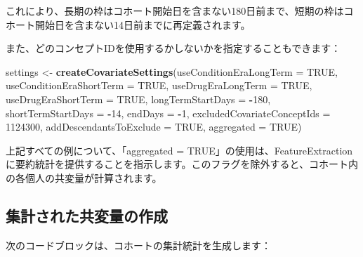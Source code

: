 \documentclass[
  11pt]{book}
\makeatletter
\newenvironment{Shaded}{\begin{snugshade}}{\end{snugshade}}
\newcommand{\AttributeTok}[1]{\textcolor[rgb]{0.13,0.29,0.53}{#1}}
\newcommand{\ConstantTok}[1]{\textcolor[rgb]{0.56,0.35,0.01}{#1}}
\newcommand{\DecValTok}[1]{\textcolor[rgb]{0.00,0.00,0.81}{#1}}
\newcommand{\FunctionTok}[1]{\textcolor[rgb]{0.13,0.29,0.53}{\textbf{#1}}}
\newcommand{\NormalTok}[1]{#1}
\newcommand{\OtherTok}[1]{\textcolor[rgb]{0.56,0.35,0.01}{#1}}
\newcommand{\SpecialCharTok}[1]{\textcolor[rgb]{0.81,0.36,0.00}{\textbf{#1}}}
\newenvironment{kframe}{%
\medskip{}
\setlength{\fboxsep}{.8em}
 \def\at@end@of@kframe{}%
 \ifinner\ifhmode%
  \def\at@end@of@kframe{\end{minipage}}%
  \begin{minipage}{\columnwidth}%
 \fi\fi%
 \def\FrameCommand##1{\hskip\@totalleftmargin \hskip-\fboxsep
 \colorbox{myShadeColor}{##1}\hskip-\fboxsep
     \hskip-\linewidth \hskip-\@totalleftmargin \hskip\columnwidth}%
 \MakeFramed {\advance\hsize-\width
   \@totalleftmargin\z@ \linewidth\hsize
   \@setminipage}}%
 {\par\unskip\endMakeFramed%
 \at@end@of@kframe}
\newenvironment{rmdblock}[1]
  {
  \begin{itemize}
  \renewcommand{\labelitemi}{
    \raisebox{-.7\height}[0pt][0pt]{
      {\setkeys{Gin}{width=3em,keepaspectratio}\texttt{[image: images/\#1]}}
    }
  }
  \setlength{\fboxsep}{1em}
  \begin{kframe}
  \item
  }
  {
  \end{kframe}
  \end{itemize}
  }
\newenvironment{rmdimportant}
  {\begin{rmdblock}{important}}
  {\end{rmdblock}}
\theoremstyle{definition}
\theoremstyle{definition}
\theoremstyle{definition}
\theoremstyle{definition}
\theoremstyle{remark}
\makeatother
\begin{document}
これにより、長期の枠はコホート開始日を含まない180日前まで、短期の枠はコホート開始日を含まない14日前までに再定義されます。

また、どのコンセプトIDを使用するかしないかを指定することもできます：

\begin{Shaded}
\begin{Highlighting}[]
\NormalTok{settings }\OtherTok{\textless{}{-}} \FunctionTok{createCovariateSettings}\NormalTok{(}\AttributeTok{useConditionEraLongTerm =} \ConstantTok{TRUE}\NormalTok{,}
                                    \AttributeTok{useConditionEraShortTerm =} \ConstantTok{TRUE}\NormalTok{,}
                                    \AttributeTok{useDrugEraLongTerm =} \ConstantTok{TRUE}\NormalTok{,}
                                    \AttributeTok{useDrugEraShortTerm =} \ConstantTok{TRUE}\NormalTok{,}
                                    \AttributeTok{longTermStartDays =} \SpecialCharTok{{-}}\DecValTok{180}\NormalTok{,}
                                    \AttributeTok{shortTermStartDays =} \SpecialCharTok{{-}}\DecValTok{14}\NormalTok{,}
                                    \AttributeTok{endDays =} \SpecialCharTok{{-}}\DecValTok{1}\NormalTok{,}
                                    \AttributeTok{excludedCovariateConceptIds =} \DecValTok{1124300}\NormalTok{,}
                                    \AttributeTok{addDescendantsToExclude =} \ConstantTok{TRUE}\NormalTok{,}
                                    \AttributeTok{aggregated =} \ConstantTok{TRUE}\NormalTok{)}
\end{Highlighting}
\end{Shaded}

\begin{rmdimportant}
上記すべての例について、「aggregated = TRUE」の使用は、FeatureExtractionに要約統計を提供することを指示します。このフラグを除外すると、コホート内の各個人の共変量が計算されます。
\end{rmdimportant}

\subsection{集計された共変量の作成}\label{ux96c6ux8a08ux3055ux308cux305fux5171ux5909ux91cfux306eux4f5cux6210}

次のコードブロックは、コホートの集計統計を生成します：
\end{document}
